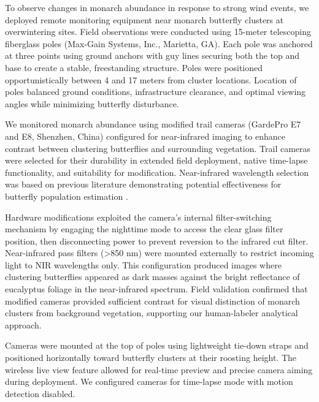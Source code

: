 To observe changes in monarch abundance in response to strong wind events, we deployed remote monitoring equipment near monarch butterfly clusters at overwintering sites. Field observations were conducted using 15-meter telescoping fiberglass poles (Max-Gain Systems, Inc., Marietta, GA). Each pole was anchored at three points using ground anchors with guy lines securing both the top and base to create a stable, freestanding structure. Poles were positioned opportunistically between 4 and 17 meters from cluster locations. Location of poles balanced ground conditions, infrastructure clearance, and optimal viewing angles while minimizing butterfly disturbance.

We monitored monarch abundance using modified trail cameras (GardePro E7 and E8, Shenzhen, China) configured for near-infrared imaging to enhance contrast between clustering butterflies and surrounding vegetation. Trail cameras were selected for their durability in extended field deployment, native time-lapse functionality, and suitability for modification. Near-infrared wavelength selection was based on previous literature demonstrating potential effectiveness for butterfly population estimation \autocite{hristov_estimating_2019}. 

Hardware modifications exploited the camera's internal filter-switching mechanism by engaging the nighttime mode to access the clear glass filter position, then disconnecting power to prevent reversion to the infrared cut filter. Near-infrared pass filters (>850 nm) were mounted externally to restrict incoming light to NIR wavelengths only. This configuration produced images where clustering butterflies appeared as dark masses against the bright reflectance of eucalyptus foliage in the near-infrared spectrum. Field validation confirmed that modified cameras provided sufficient contrast for visual distinction of monarch clusters from background vegetation, supporting our human-labeler analytical approach.

Cameras were mounted at the top of poles using lightweight tie-down straps and positioned horizontally toward butterfly clusters at their roosting height. The wireless live view feature allowed for real-time preview and precise camera aiming during deployment. We configured cameras for time-lapse mode with motion detection disabled. 

